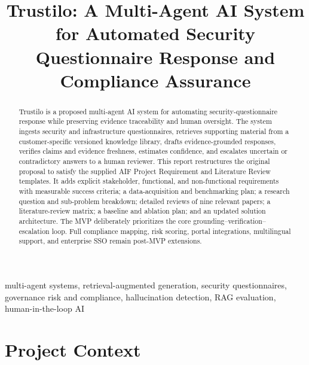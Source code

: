 \documentclass[11pt,journal,onecolumn]{IEEEtran}
\begin{document}
\title{Trustilo: A Multi-Agent AI System for Automated Security\\Questionnaire Response and Compliance Assurance}
\author{}
\maketitle

\begin{abstract}
Trustilo is a proposed multi-agent AI system for automating security-questionnaire response while preserving evidence traceability and human oversight. The system ingests security and infrastructure questionnaires, retrieves supporting material from a customer-specific versioned knowledge library, drafts evidence-grounded responses, verifies claims and evidence freshness, estimates confidence, and escalates uncertain or contradictory answers to a human reviewer. This report restructures the original proposal to satisfy the supplied AIF Project Requirement and Literature Review templates. It adds explicit stakeholder, functional, and non-functional requirements with measurable success criteria; a data-acquisition and benchmarking plan; a research question and sub-problem breakdown; detailed reviews of nine relevant papers; a literature-review matrix; a baseline and ablation plan; and an updated solution architecture. The MVP deliberately prioritizes the core grounding--verification--escalation loop. Full compliance mapping, risk scoring, portal integrations, multilingual support, and enterprise SSO remain post-MVP extensions.
\end{abstract}

\begin{IEEEkeywords}
multi-agent systems, retrieval-augmented generation, security questionnaires, governance risk and compliance, hallucination detection, RAG evaluation, human-in-the-loop AI
\end{IEEEkeywords}

\section{Project Context}
\end{document}
